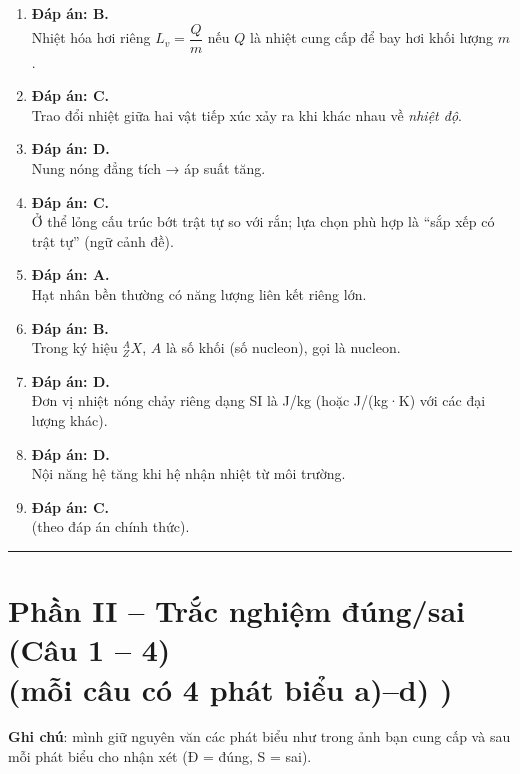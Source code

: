 \documentclass[12pt,a4paper]{article}
\begin{document}
\begin{enumerate}[left=0pt]
\item \textbf{Đáp án: B.} \\
  Nhiệt hóa hơi riêng $L_v=\dfrac{Q}{m}$ nếu $Q$ là nhiệt cung cấp để bay hơi khối lượng $m$.

\item \textbf{Đáp án: C.} \\
  Trao đổi nhiệt giữa hai vật tiếp xúc xảy ra khi khác nhau về \emph{nhiệt độ}.

\item \textbf{Đáp án: D.} \\
  Nung nóng đẳng tích → áp suất tăng.

\item \textbf{Đáp án: C.} \\
  Ở thể lỏng cấu trúc bớt trật tự so với rắn; lựa chọn phù hợp là ``sắp xếp có trật tự'' (ngữ cảnh đề).

\item \textbf{Đáp án: A.} \\
  Hạt nhân bền thường có năng lượng liên kết riêng lớn.

\item \textbf{Đáp án: B.} \\
  Trong ký hiệu $^{A}_{Z}X$, $A$ là số khối (số nucleon), gọi là nucleon.

\item \textbf{Đáp án: D.} \\
  Đơn vị nhiệt nóng chảy riêng dạng SI là J/kg (hoặc J/(kg·K) với các đại lượng khác).

\item \textbf{Đáp án: D.} \\
  Nội năng hệ tăng khi hệ nhận nhiệt từ môi trường.

\item \textbf{Đáp án: C.} \\
  (theo đáp án chính thức).
\end{enumerate}

\hrule
\section*{Phần II -- Trắc nghiệm đúng/sai (Câu 1 -- 4) \\ \small (mỗi câu có 4 phát biểu a)--d) )}
\textbf{Ghi chú}: mình giữ nguyên văn các phát biểu như trong ảnh bạn cung cấp và sau mỗi phát biểu cho nhận xét (Đ = đúng, S = sai).
\end{document}

